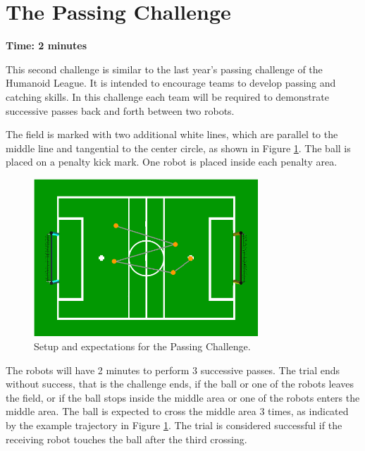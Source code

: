 \documentclass{article}
\begin{document}
\newpage
\section{The Passing Challenge}
\label{sec:passing}

\textbf{Time: 2 minutes}

This second challenge is similar to the last year's passing challenge of the Humanoid League. It is intended to encourage teams to develop passing and catching skills. In this challenge each team will be required to demonstrate successive passes back and forth between two robots.

The field is marked with two additional white lines, which are parallel to the middle line and tangential to the center circle, as shown in Figure \ref{fig:passingchallenge}. The ball is placed on a penalty kick mark.
One robot is placed inside each penalty area.


\begin{figure}[htbp]
 \centering
 \includegraphics[width=0.75\textwidth]{figures/nao_passingchallenge.png}
 \caption{Setup and expectations for the Passing Challenge.}
 \label{fig:passingchallenge}
\end{figure}

The robots will have 2 minutes to perform 3 successive passes. The trial ends without success, that is the challenge ends, if the ball or one of the robots leaves the field, or if the ball stops inside the middle area or one of the robots enters the middle area. The ball is expected to cross the middle area 3 times, as indicated by the example trajectory in Figure \ref{fig:passingchallenge}. The trial is considered successful if the receiving robot touches the ball after the third crossing.
\end{document}
